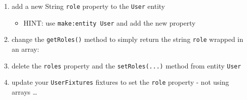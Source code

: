 \documentclass[a4paperpaper,openright]{book}
\newenvironment{Shaded}{}{}
\newcommand{\KeywordTok}[1]{\textcolor[rgb]{0.00,0.44,0.13}{\textbf{#1}}}
\newcommand{\NormalTok}[1]{#1}
\newcommand{\OtherTok}[1]{\textcolor[rgb]{0.00,0.44,0.13}{#1}}
\providecommand{\tightlist}{%
  \setlength{\itemsep}{0pt}\setlength{\parskip}{0pt}}
\begin{document}
\begin{enumerate}
\def\labelenumi{\arabic{enumi}.}
\item
  add a new String \texttt{role} property to the \texttt{User} entity

  \begin{itemize}
  \tightlist
  \item
    HINT: use \texttt{make:entity\ User} and add the new property
  \end{itemize}
\item
  change the \texttt{getRoles()} method to simply return the string
  \texttt{role} wrapped in an array:

\begin{Shaded}
\end{Shaded}
\item
  delete the \texttt{roles} property and the \texttt{setRoles(...)}
  method from entity \texttt{User}
\item
  update your \texttt{UserFixtures} fixtures to set the \texttt{role}
  property - not using arrays \ldots{}
\end{enumerate}
\end{document}
